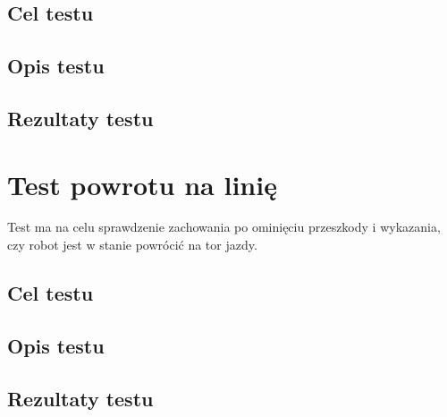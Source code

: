 \subsection{Cel testu}
\subsection{Opis testu}
\subsection{Rezultaty testu}

\section{Test powrotu na linię}
Test ma na celu sprawdzenie zachowania po ominięciu przeszkody i wykazania, czy robot jest w stanie powrócić na tor jazdy.
\subsection{Cel testu}
\subsection{Opis testu}
\subsection{Rezultaty testu}